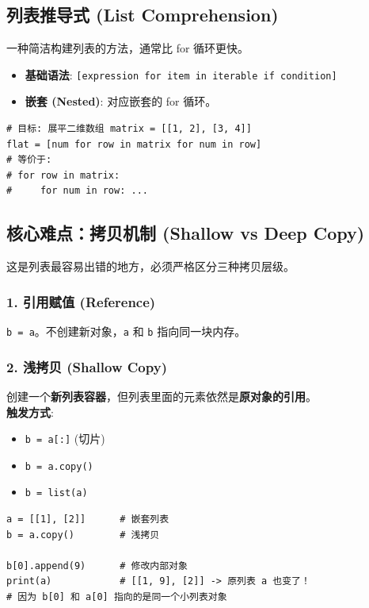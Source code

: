 \documentclass[12pt, a4paper]{article}
\begin{document}
\subsection{列表推导式 (List Comprehension)}

一种简洁构建列表的方法，通常比 for 循环更快。

\begin{itemize}
    \item \textbf{基础语法}: \texttt{[expression for item in iterable if condition]}
    \item \textbf{嵌套 (Nested)}: 对应嵌套的 for 循环。
\end{itemize}

\begin{lstlisting}[caption={嵌套推导式示例}]
# 目标: 展平二维数组 matrix = [[1, 2], [3, 4]]
flat = [num for row in matrix for num in row]
# 等价于:
# for row in matrix:
#     for num in row: ...
\end{lstlisting}

\subsection{核心难点：拷贝机制 (Shallow vs Deep Copy)}

这是列表最容易出错的地方，必须严格区分三种拷贝层级。

\subsubsection{1. 引用赋值 (Reference)}
\texttt{b = a}。不创建新对象，\texttt{a} 和 \texttt{b} 指向同一块内存。

\subsubsection{2. 浅拷贝 (Shallow Copy)}
创建一个\textbf{新列表容器}，但列表里面的元素依然是\textbf{原对象的引用}。
\\ \textbf{触发方式}: 
\begin{itemize}
    \item \texttt{b = a[:]} (切片)
    \item \texttt{b = a.copy()}
    \item \texttt{b = list(a)}
\end{itemize}

\begin{lstlisting}[caption={浅拷贝的局限性}]
a = [[1], [2]]      # 嵌套列表
b = a.copy()        # 浅拷贝

b[0].append(9)      # 修改内部对象
print(a)            # [[1, 9], [2]] -> 原列表 a 也变了！
# 因为 b[0] 和 a[0] 指向的是同一个小列表对象
\end{lstlisting}
\end{document}
